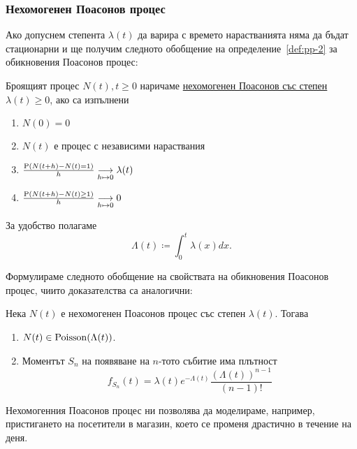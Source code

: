 \documentclass[numbers=endperiod, DIV=15, bibliography=totocnumbered]{scrartcl}
\begin{document}
\subsubsection{Нехомогенен Поасонов процес}

Ако допуснем степента $\lambda(t)$ да варира с времето нарастванията няма да бъдат стационарни и ще получим следното обобщение на определение~\ref{def:pp-2} за обикновения Поасонов процес:
\begin{definition}
  Броящият процес $N(t), t \geq 0$ наричаме \uline{нехомогенен Поасонов със степен $\lambda(t) \geq 0$}, ако са изпълнени
  \begin{enumerate}
    \item $N(0) = 0$
    \item $N(t)$ е процес с независими нараствания
    \item $\frac {\operatorname{P}(N(t+h) - N(t) = 1)} h \underset {h \mapsto 0} \longrightarrow \lambda(t)$
    \item $\frac {\operatorname{P}(N(t+h) - N(t) \geq 1)} h \underset {h \mapsto 0} \longrightarrow 0$
  \end{enumerate}

  За удобство полагаме
  \begin{displaymath}
    \Lambda(t) \coloneqq \int_0^t \lambda(x) dx.
  \end{displaymath}
\end{definition}

Формулираме следното обобщение на свойствата на обикновения Поасонов процес, чиито доказателства са аналогични:
\begin{theorem}
  Нека $N(t)$ е нехомогенен Поасонов процес със степен $\lambda(t)$. Тогава
  \begin{enumerate}
    \item $N(t) \in \operatorname{Poisson}(\Lambda(t))$.
    \item Моментът $S_n$ на появяване на $n$-тото събитие има плътност
    \begin{displaymath}
      f_{S_n}(t) = \lambda(t) e^{-\Lambda(t)} \frac {{(\Lambda(t))}^{n-1}} {(n-1)!}
    \end{displaymath}
  \end{enumerate}
\end{theorem}

\begin{note}
  Нехомогенния Поасонов процес ни позволява да моделираме, например, пристигането на посетители в магазин, което се променя драстично в течение на деня.
\end{note}

\printbibliography
\end{document}
